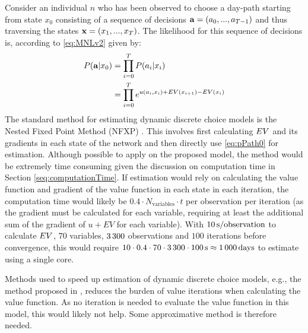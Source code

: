 
Consider an individual $n$ who has been observed to choose a day-path starting from state $x_0$ consisting of a sequence of decisions  ${\bf a} = (a_0,...,a_{T-1})$ and thus traversing the states ${\bf x} = (x_1,...,x_{T})$. The likelihood for this sequence of decisions is, according to \eqref{eq:MNLv2} given by:
 \begin{equation}\label{eq:pPath0}
 \begin{aligned}
 P(\ve{a}|x_0) & = \prod_{i=0}^{T}P(a_i|x_i) \\
 & = \prod_{i=0}^{T} e^{u(a_i,x_i) + \eutil(x_{i+1})-\eutil(x_i)}
 \end{aligned}
 \end{equation}
The standard method for estimating dynamic discrete choice models is the Nested Fixed Point Method (NFXP) \citep{RustML88}. This involves first calculating $EV$ and its gradients in each state of the network and then directly use \eqref{eq:pPath0} for estimation. Although possible to apply on the proposed model, the method would be extremely time consuming given the discussion on computation time in Section \ref{seq:computationTime}. If estimation would rely on calculating the value function and gradient of the value function in each state in each iteration, the computation time would likely be $0.4\cdot N_{\text{variables}} \cdot t$ per observation per iteration (as the gradient must be calculated for each variable, requiring at least the additional sum of the gradient of $u + EV$ for each variable). With $10\,\text{s/observation}$ to calculate $EV$, $70$ variables, $3\, 300$ observations and $100$ iterations before convergence, this would require $10 \cdot 0.4 \cdot  70 \cdot 3\, 300 \cdot 100 \,\text{s} \approx 1\, 000 \,\text{days}$ to estimate using a single core. 

Methods used to speed up estimation of dynamic discrete choice models, e.g., the method proposed in \citet{aguirregabiria2002swapping}, reduces the burden of value iterations when calculating the value function. As no iteration is needed to evaluate the value function in this model, this would likely not help. Some approximative method is therefore needed.

